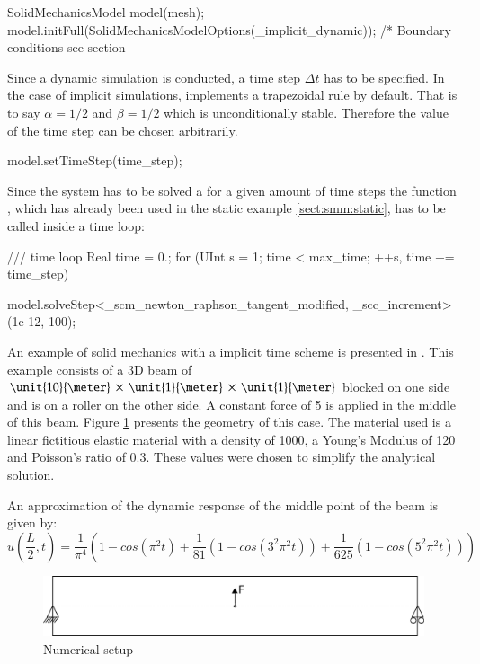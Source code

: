 \begin{cpp} SolidMechanicsModel model(mesh);
model.initFull(SolidMechanicsModelOptions(_implicit_dynamic)); /*
Boundary conditions see section %
\end{cpp} Since a dynamic simulation is conducted, a time step $\Delta
t$ has to be specified. In the case of implicit simulations, \akantu
implements a trapezoidal rule by default.  That is to say $\alpha =
1/2$ and $\beta = 1/2$ which is unconditionally stable. Therefore the
value of the time step can be chosen arbitrarily.
\begin{cpp} model.setTimeStep(time_step);
\end{cpp} Since the system has to be solved a for a given amount of
time steps the function , which has already been
used in the static example \ref{sect:smm:static}, has to be called
inside a time loop:
\begin{cpp} /// time loop Real time = 0.; for (UInt s = 1; time <
max_time; ++s, time += time_step) {

    model.solveStep<_scm_newton_raphson_tangent_modified,
_scc_increment>(1e-12, 100); }
\end{cpp} An example of solid mechanics with a implicit time scheme is
presented in .
This example consists of a 3D beam of
$\unit{10}{\meter}\,\times\,\unit{1}{\meter}\,\times\,\unit{1}{\meter}$
blocked on one side and is on a roller on the other side.  A constant
force of \unit{5}{\kilo\newton} is applied in the middle of this beam.
Figure \ref{fig:smm:implicit:dynamic} presents the geometry of this
case. The material used is a linear fictitious elastic material with a
density of \unit{1000}{\kilogrampercubicmetre}, a Young's Modulus of
\unit{120}{\mega\pascal} and Poisson's ratio of $0.3$. These values
were chosen to simplify the analytical solution.

An approximation of the dynamic response of the middle point of the
beam is given by:
\begin{equation}\label{eqn:smm:implicit} u\left(\frac{L}{2}, t\right)
= \frac{1}{\pi^4} \left(1 - cos\left(\pi^2 t\right) +
\frac{1}{81}\left(1 - cos\left(3^2 \pi^2 t\right)\right) +
\frac{1}{625}\left(1 - cos\left(5^2 \pi^2 t\right)\right)\right)
\end{equation}

\begin{figure}[!htb] \centering
  \includegraphics[scale=.6]{figures/implicit_dynamic}
  \caption{Numerical setup}
  \label{fig:smm:implicit:dynamic}
\end{figure}

